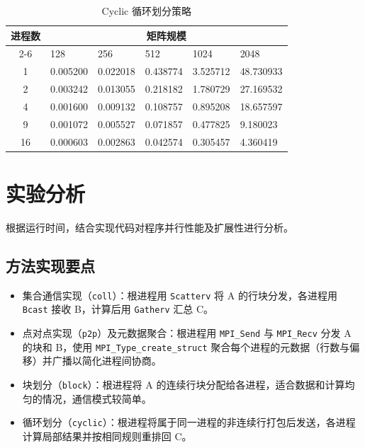 \documentclass{SYSUReport}
\begin{document}
\begin{table}[H]
\centering
\label{表3}
\begin{tabular}{|c|lllll|}
\hline
\multirow{2}{*}{进程数} & \multicolumn{5}{c|}{矩阵规模}                                                                        \\ \cline{2-6} 
 & \multicolumn{1}{l|}{128} & \multicolumn{1}{l|}{256} & \multicolumn{1}{l|}{512} & \multicolumn{1}{l|}{1024} & 2048 \\ \hline
1                    & \multicolumn{1}{l|}{0.005200} & \multicolumn{1}{l|}{0.022018} & \multicolumn{1}{l|}{0.438774} & \multicolumn{1}{l|}{3.525712} & 48.730933 \\ \hline
2                    & \multicolumn{1}{l|}{0.003242} & \multicolumn{1}{l|}{0.013055} & \multicolumn{1}{l|}{0.218182} & \multicolumn{1}{l|}{1.780729} & 27.169532 \\ \hline
4                    & \multicolumn{1}{l|}{0.001600} & \multicolumn{1}{l|}{0.009132} & \multicolumn{1}{l|}{0.108757} & \multicolumn{1}{l|}{0.895208} & 18.657597 \\ \hline
9                    & \multicolumn{1}{l|}{0.001072} & \multicolumn{1}{l|}{0.005527} & \multicolumn{1}{l|}{0.071857} & \multicolumn{1}{l|}{0.477825} & 9.180023 \\ \hline
16                   & \multicolumn{1}{l|}{0.000603} & \multicolumn{1}{l|}{0.002863} & \multicolumn{1}{l|}{0.042574} & \multicolumn{1}{l|}{0.305457} & 4.360419 \\ \hline
\end{tabular}
\caption{Cyclic 循环划分策略}
\end{table}

\section{实验分析}
根据运行时间，结合实现代码对程序并行性能及扩展性进行分析。

\subsection{方法实现要点}
\begin{itemize}
    \item 集合通信实现（\texttt{coll}）：根进程用 \texttt{Scatterv} 将 A 的行块分发，各进程用 \texttt{Bcast} 接收 B，计算后用 \texttt{Gatherv} 汇总 C。
    \item 点对点实现（\texttt{p2p}）及元数据聚合：根进程用 \texttt{MPI\_Send} 与 \texttt{MPI\_Recv} 分发 A 的块和 B，使用 \texttt{MPI\_Type\_create\_struct} 聚合每个进程的元数据（行数与偏移）并广播以简化进程间协商。
    \item 块划分（\texttt{block}）：根进程将 A 的连续行块分配给各进程，适合数据和计算均匀的情况，通信模式较简单。
    \item 循环划分（\texttt{cyclic}）：根进程将属于同一进程的非连续行打包后发送，各进程计算局部结果并按相同规则重排回 C。
\end{itemize}
\end{document}
